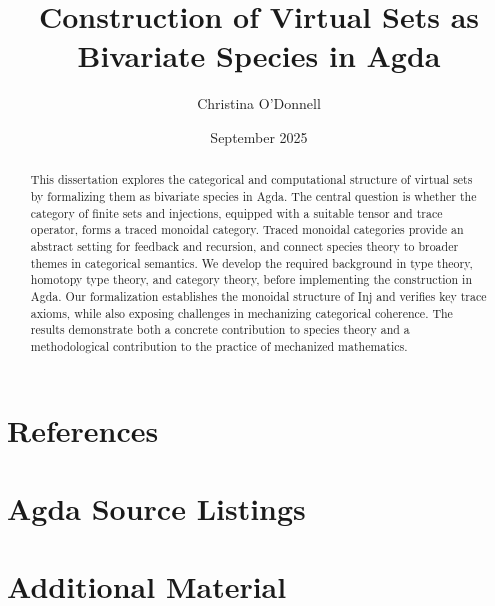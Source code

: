 \documentclass[4pt,a4paper]{report}
\title{Construction of Virtual Sets as Bivariate Species in Agda}
\author{Christina O'Donnell}
\date{September 2025}
\begin{document}
\maketitle
\begin{abstract}
	This dissertation explores the categorical and computational structure of
	virtual sets by formalizing them as bivariate species in Agda. The central
	question is whether the category of finite sets and injections, equipped
	with a suitable tensor and trace operator, forms a traced monoidal category.
	Traced monoidal categories provide an abstract setting for feedback and
	recursion, and connect species theory to broader themes in categorical
	semantics. We develop the required background in type theory, homotopy type
	theory, and category theory, before implementing the construction in Agda.
	Our formalization establishes the monoidal structure of Inj and verifies key
	trace axioms, while also exposing challenges in mechanizing categorical
	coherence. The results demonstrate both a concrete contribution to species
	theory and a methodological contribution to the practice of mechanized
	mathematics.
\end{abstract}
\tableofcontents
\listoffigures
\listoftables



\appendix
\chapter{References}


\chapter{Agda Source Listings}
\chapter{Additional Material}
\end{document}
